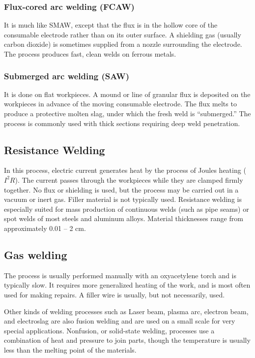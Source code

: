 \documentclass[
10pt,
a4paper,
openany,
svgnames,
]{book}
\begin{document}
\subsubsection{Flux-cored arc welding (FCAW)}

It is much like SMAW, except that the flux is in the hollow core of the consumable electrode rather than on its outer surface. A shielding gas (usually carbon dioxide) is sometimes supplied from a nozzle surrounding the electrode. The process produces fast, clean welds on ferrous metals.

\subsubsection{Submerged arc welding (SAW)}

It is done on flat workpieces. A mound or line of granular flux is deposited on the workpieces in advance of the moving consumable electrode. The flux melts to produce a protective molten slag, under which the fresh weld is “submerged.” The process is commonly used with thick sections requiring deep weld penetration.

\subsection{Resistance Welding}

In this process, electric current generates heat by the process of Joules heating ($I^2R$). The current passes through the workpieces while they are clamped firmly together. No flux or shielding is used, but the process may be carried out in a vacuum or inert gas. Filler material is not typically used. Resistance welding is especially suited for mass production of continuous welds (such as pipe seams) or spot welds of most steels and aluminum alloys. Material thicknesses range from approximately 0.01 – 2 cm.
	
\subsection{Gas welding}

The process is usually performed manually with an oxyacetylene torch and is typically slow. It requires more generalized heating of the work, and is most often used for making repairs. A filler wire is usually, but not necessarily, used.
  
Other kinds of welding processes such as Laser beam, plasma arc, electron beam, and electroslag are also fusion welding and are used on a small scale for very special applications.
Nonfusion, or solid-state welding, processes use a combination of heat and pressure to join parts, though the temperature is usually less than the melting point of the materials.
\end{document}
